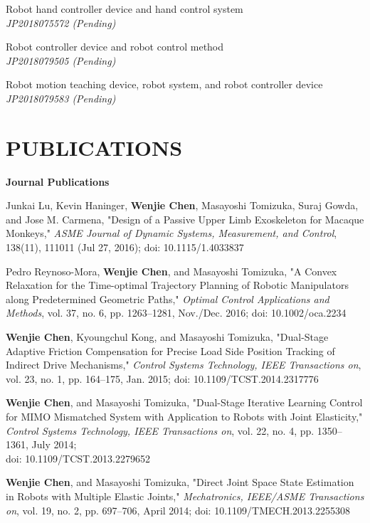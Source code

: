 \documentclass[UTF8,nofonts]{res}
\begin{document}
\begin{resume}
\begin{etaremune}
	\item Robot hand controller device and hand control system {\it \\JP2018075572 (Pending)}
	\item Robot controller device and robot control method {\it \\JP2018079505 (Pending)}
	\item Robot motion teaching device, robot system, and robot controller device {\it \\JP2018079583 (Pending)}
\end{etaremune}

\section{PUBLICATIONS}
\vspace{0.1in}
    \textbf{Journal Publications} %
    \begin{etaremune}[start=7]
    \item Junkai Lu, Kevin Haninger, \textbf{Wenjie Chen}, Masayoshi Tomizuka, Suraj Gowda, and Jose M. Carmena, "Design of a Passive Upper Limb Exoskeleton for Macaque Monkeys," \emph{ASME Journal of Dynamic Systems, Measurement, and Control}, 138(11), 111011 (Jul 27, 2016); doi: 10.1115/1.4033837
    \item Pedro Reynoso-Mora, \textbf{Wenjie Chen}, and Masayoshi Tomizuka, "A Convex Relaxation for the Time-optimal Trajectory Planning of Robotic Manipulators along Predetermined Geometric Paths," \emph{Optimal Control Applications and Methods}, vol. 37, no. 6, pp. 1263--1281, Nov./Dec. 2016; doi: 10.1002/oca.2234
    \item \textbf{Wenjie Chen}, Kyoungchul Kong, and Masayoshi Tomizuka, "Dual-Stage Adaptive Friction Compensation for Precise Load Side Position Tracking of Indirect Drive Mechanisms," \emph{Control Systems Technology, IEEE Transactions on}, vol. 23, no. 1, pp. 164--175, Jan. 2015;  doi: 10.1109/TCST.2014.2317776
    \item \textbf{Wenjie Chen}, and Masayoshi Tomizuka, "Dual-Stage Iterative Learning Control for MIMO Mismatched System with Application to Robots with Joint Elasticity," \emph{Control Systems Technology, IEEE Transactions on}, vol. 22, no. 4, pp. 1350--1361, July 2014; \\doi: 10.1109/TCST.2013.2279652
    \item \textbf{Wenjie Chen}, and Masayoshi Tomizuka, "Direct Joint Space State Estimation in Robots with Multiple Elastic Joints," \emph{Mechatronics, IEEE/ASME Transactions on}, vol. 19, no. 2, pp. 697--706, April 2014; doi: 10.1109/TMECH.2013.2255308

\end{etaremune}
\end{resume}
\end{document}
